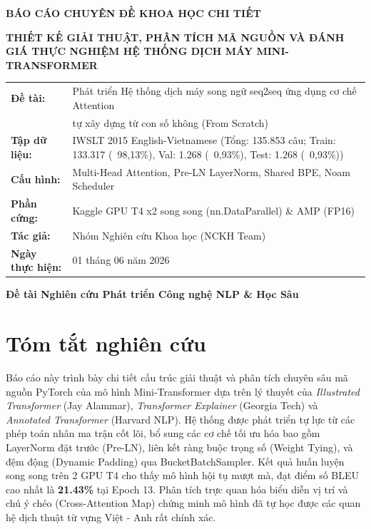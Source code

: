 \documentclass[12pt,a4paper]{report}
\begin{document}
\begin{titlepage}
    \centering
    \vspace*{2cm}
    {\large\bfseries BÁO CÁO CHUYÊN ĐỀ KHOA HỌC CHI TIẾT\par}
    \vspace{1.5cm}
    {\huge\bfseries THIẾT KẾ GIẢI THUẬT, PHÂN TÍCH MÃ NGUỒN VÀ ĐÁNH GIÁ THỰC NGHIỆM HỆ THỐNG DỊCH MÁY MINI-TRANSFORMER\par}
    \vspace{2cm}
    
    \begin{tabular}{ll}
        \textbf{Đề tài:} & Phát triển Hệ thống dịch máy song ngữ seq2seq ứng dụng cơ chế Attention \\
        & tự xây dựng từ con số không (From Scratch) \\
        \textbf{Tập dữ liệu:} & IWSLT 2015 English-Vietnamese (Tổng: 135.853 câu; Train: 133.317 (~98,13\%), Val: 1.268 (~0,93\%), Test: 1.268 (~0,93\%)) \\
        \textbf{Cấu hình:} & Multi-Head Attention, Pre-LN LayerNorm, Shared BPE, Noam Scheduler \\
        \textbf{Phần cứng:} & Kaggle GPU T4 x2 song song (nn.DataParallel) \& AMP (FP16) \\
        \textbf{Tác giả:} & Nhóm Nghiên cứu Khoa học (NCKH Team) \\
        \textbf{Ngày thực hiện:} & 01 tháng 06 năm 2026 \\
    \end{tabular}
    
    \vfill
    {\large\bfseries Đề tài Nghiên cứu Phát triển Công nghệ NLP \& Học Sâu\par}
\end{titlepage}

\newpage

\chapter*{Tóm tắt nghiên cứu}

Báo cáo này trình bày chi tiết cấu trúc giải thuật và phân tích chuyên sâu mã nguồn PyTorch của mô hình Mini-Transformer dựa trên lý thuyết của \textit{Illustrated Transformer} (Jay Alammar), \textit{Transformer Explainer} (Georgia Tech) và \textit{Annotated Transformer} (Harvard NLP). Hệ thống được phát triển tự lực từ các phép toán nhân ma trận cốt lõi, bổ sung các cơ chế tối ưu hóa bao gồm LayerNorm đặt trước (Pre-LN), liên kết ràng buộc trọng số (Weight Tying), và đệm động (Dynamic Padding) qua BucketBatchSampler. Kết quả huấn luyện song song trên 2 GPU T4 cho thấy mô hình hội tụ mượt mà, đạt điểm số BLEU cao nhất là \textbf{21.43\%} tại Epoch 13. Phân tích trực quan hóa biểu diễn vị trí và chú ý chéo (Cross-Attention Map) chứng minh mô hình đã tự học được các quan hệ dịch thuật từ vựng Việt - Anh rất chính xác.
\end{document}
